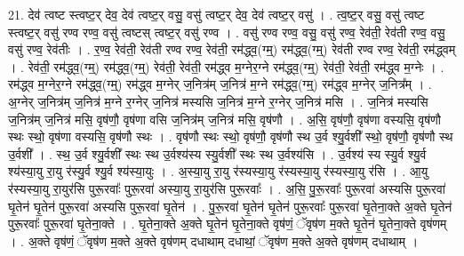 \documentclass[17pt]{extarticle}
\begin{document}
21. देव॑ त्वष्ट स्त्वष्ट॒र् देव॒ देव॑ त्वष्ट॒र् वसु॒ वसु॑ त्वष्ट॒र् देव॒ देव॑ त्वष्ट॒र् वसु॑ । . त्व॒ष्ट॒र् वसु॒ वसु॑ त्वष्ट स्त्वष्ट॒र् वसु॑ रण्व रण्व॒ वसु॑ त्वष्टस् त्वष्ट॒र् वसु॑ रण्व । . वसु॑ रण्व रण्व॒ वसु॒ वसु॑ रण्व॒ रेव॑ती॒ रेव॑ती रण्व॒ वसु॒ वसु॑ रण्व॒ रेव॑तीः । . र॒ण्व॒ रेव॑ती॒ रेव॑ती रण्व रण्व॒ रेव॑ती॒ रम॑द्ध्व॒(ग्म्॒) रम॑द्ध्व॒(ग्म्॒) रेव॑ती रण्व रण्व॒ रेव॑ती॒ रम॑द्ध्वम् । . रेव॑ती॒ रम॑द्ध्व॒(ग्म्॒) रम॑द्ध्व॒(ग्म्॒) रेव॑ती॒ रेव॑ती॒ रम॑द्ध्व म॒ग्नेर॒ग्ने रम॑द्ध्व॒(ग्म्॒) रेव॑ती॒ रेव॑ती॒ रम॑द्ध्व म॒ग्नेः । . रम॑द्ध्व म॒ग्नेर॒ग्ने रम॑द्ध्व॒(ग्म्॒) रम॑द्ध्व म॒ग्नेर् ज॒नित्र॑म् ज॒नित्र॑ म॒ग्ने रम॑द्ध्व॒(ग्म्॒) रम॑द्ध्व म॒ग्नेर् ज॒नित्र᳚म् । . अ॒ग्नेर् ज॒नित्र॑म् ज॒नित्र॑ म॒ग्ने र॒ग्नेर् ज॒नित्र॑ मस्यसि ज॒नित्र॑ म॒ग्ने र॒ग्नेर् ज॒नित्र॑ मसि । . ज॒नित्र॑ मस्यसि ज॒नित्र॑म् ज॒नित्र॑ मसि॒ वृष॑णौ॒ वृष॑णा वसि ज॒नित्र॑म् ज॒नित्र॑ मसि॒ वृष॑णौ । . अ॒सि॒ वृष॑णौ॒ वृष॑णा वस्यसि॒ वृष॑णौ स्थः स्थो॒ वृष॑णा वस्यसि॒ वृष॑णौ स्थः । . वृष॑णौ स्थः स्थो॒ वृष॑णौ॒ वृष॑णौ स्थ उ॒र्व श्यु॒र्वशी᳚ स्थो॒ वृष॑णौ॒ वृष॑णौ स्थ उ॒र्वशी᳚ । . स्थ॒ उ॒र्व श्यु॒र्वशी᳚ स्थः स्थ उ॒र्वश्य॑स्य स्यु॒र्वशी᳚ स्थः स्थ उ॒र्वश्य॑सि । . उ॒र्वश्य॑ स्य स्यु॒र्व श्यु॒र्व श्य॑स्या॒यु रा॒यु र॑स्यु॒र्व श्यु॒र्व श्य॑स्या॒युः । . अ॒स्या॒यु रा॒यु र॑स्यस्या॒यु र॑स्यस्या॒यु र॑स्यस्या॒यु र॑सि । . आ॒यु र॑स्यस्या॒यु रा॒युर॑सि पुरू॒रवाः᳚ पुरू॒रवा॑ अस्या॒यु रा॒युर॑सि पुरू॒रवाः᳚ । . अ॒सि॒ पु॒रू॒रवाः᳚ पुरू॒रवा॑ अस्यसि पुरू॒रवा॑ घृ॒तेन॑ घृ॒तेन॑ पुरू॒रवा॑ अस्यसि पुरू॒रवा॑ घृ॒तेन॑ । . पु॒रू॒रवा॑ घृ॒तेन॑ घृ॒तेन॑ पुरू॒रवाः᳚ पुरू॒रवा॑ घृ॒तेना॒क्ते अ॒क्ते घृ॒तेन॑ पुरू॒रवाः᳚ पुरू॒रवा॑ घृ॒तेना॒क्ते । . घृ॒तेना॒क्ते अ॒क्ते घृ॒तेन॑ घृ॒तेना॒क्ते वृष॑णं॒ ॅवृष॑ण म॒क्ते घृ॒तेन॑ घृ॒तेना॒क्ते वृष॑णम् । . अ॒क्ते वृष॑णं॒ ॅवृष॑ण म॒क्ते अ॒क्ते वृष॑णम् दधाथाम् दधाथां॒ ॅवृष॑ण म॒क्ते अ॒क्ते वृष॑णम् दधाथाम् । \newline
\end{document}
